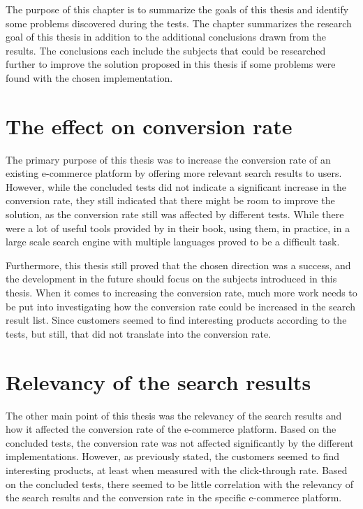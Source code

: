 


The purpose of this chapter is to summarize the goals of this thesis and identify some problems discovered
during the tests.
The chapter summarizes the research goal of this thesis in addition to the additional conclusions drawn
from the results.
The conclusions each include the subjects that could be researched further to improve the solution proposed in this thesis
if some problems were found with the chosen implementation.


\section{The effect on conversion rate}

The primary purpose of this thesis was to increase the conversion rate of an existing e-commerce platform by offering
more relevant search results to users. 
However, while the concluded tests did not indicate a significant increase in the conversion rate, they still
indicated that there might be room to improve the solution, as the conversion rate still was affected by different
tests.
While there were a lot of useful tools provided by \citeauthor{relevantSearch} \cite{relevantSearch} in their book, 
using them, in practice, in a large scale search engine with multiple languages proved to be a difficult task.

Furthermore, this thesis still proved that the chosen direction was a success, and the development in the future
should focus on the subjects introduced in this thesis.
When it comes to increasing the conversion rate, much more work needs to be put into investigating 
how the conversion rate could be increased in the search result list.
Since customers seemed to find interesting products according to the tests, but still, 
that did not translate into the conversion rate.


\section{Relevancy of the search results}

The other main point of this thesis was the relevancy of the search results and how it affected the conversion rate 
of the e-commerce platform.
Based on the concluded tests, the conversion rate was not affected significantly by the different implementations.
However, as previously stated, the customers seemed to find interesting products, at least when measured with the 
click-through rate. 
Based on the concluded tests, there seemed to be little correlation with the relevancy of the search results
and the conversion rate in the specific e-commerce platform.

